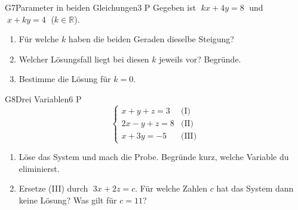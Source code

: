 \documentclass[11pt]{article}
\begin{document}

\begin{lpaufgabe}{G7}{Parameter in beiden Gleichungen}{3 P}
Gegeben ist $\;kx + 4y = 8\;$ und $\;x + ky = 4\;$ ($k \in \mathbb{R}$).
\begin{enumerate}[label=(\alph*),leftmargin=*,itemsep=1pt]
\item Für welche $k$ haben die beiden Geraden dieselbe Steigung?
\item Welcher Lösungsfall liegt bei diesen $k$ jeweils vor? Begründe.
\item Bestimme die Lösung für $k = 0$.
\end{enumerate}
\end{lpaufgabe}

\begin{lpaufgabe}{G8}{Drei Variablen}{6 P}
\[ \begin{cases} x + y + z = 3 & \text{(I)} \\ 2x - y + z = 8 & \text{(II)} \\ x + 3y = -5 & \text{(III)} \end{cases} \]
\begin{enumerate}[label=(\alph*),leftmargin=*,itemsep=1pt]
\item Löse das System und mach die Probe. Begründe kurz, welche Variable du eliminierst.
\item Ersetze (III) durch $\;3x + 2z = c$. Für welche Zahlen $c$ hat das System dann keine Lösung? Was gilt für $c = 11$?
\end{enumerate}
\end{lpaufgabe}
\end{document}
